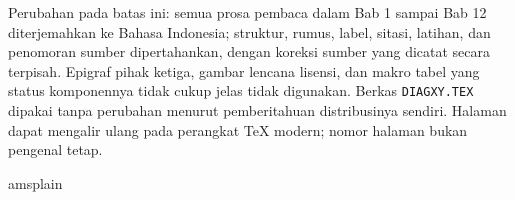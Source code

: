 \documentclass[11pt,reqno]{amsbook}
\theoremstyle{definition}
\theoremstyle{remark}
\numberwithin{equation}{section}
\begin{document}
Perubahan pada batas ini: semua prosa pembaca dalam Bab 1 sampai Bab 12
diterjemahkan ke Bahasa Indonesia; struktur, rumus, label, sitasi, latihan,
dan penomoran sumber dipertahankan, dengan koreksi sumber yang dicatat secara
terpisah. Epigraf pihak ketiga, gambar lencana lisensi, dan makro tabel yang
status komponennya tidak cukup jelas tidak digunakan. Berkas
\texttt{DIAGXY.TEX} dipakai tanpa perubahan menurut pemberitahuan distribusinya
sendiri. Halaman dapat
mengalir ulang pada perangkat TeX modern; nomor halaman bukan pengenal tetap.



\vfill\eject

\tableofcontents




\mainmatter




 
 
 
 
 
 
 
 
 
 
 
 






\backmatter


 \clearpage
  {amsplain}
 


 \cleardoublepage
 \printindex
\end{document}
